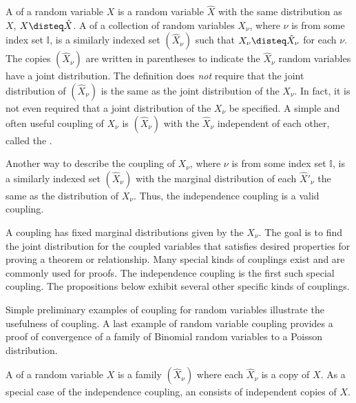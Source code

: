 \documentclass[12pt]{article}
\begin{document}
\begin{definition}
    A %
    of a random variable \( X \) is a random variable \( \hat{X} \) with
    the same distribution as \( X \), \( X \disteq \hat{X} \).  A 
    of a collection of random variables \( X_\nu \), where \( \nu \) is
    from some index set \( \mathbb{I} \), is a similarly indexed set \(
    (\hat{X}_\nu) \) such that \( X_{\nu} \disteq \hat{X}_{\nu} \) for
    each \( \nu \).  The copies \( (\hat{X}_\nu) \) are written in
    parentheses to indicate the \( \hat{X}_\nu \) random variables have
    a joint distribution.  The definition does \emph{not} require that
    the joint distribution of \( (\hat{X}_{\nu}) \) is the same as the
    joint distribution of the \( X_{\nu} \).  In fact, it is not even
    required that a joint distribution of the \( X_{\nu} \) be
    specified.  A simple and often useful coupling of \( X_{\nu} \) is \(
    (\hat{X}_\nu) \) with the \( \hat{X}_{\nu} \) independent of each
    other, called the .
\end{definition}
%

\begin{remark}
    Another way to describe the coupling of \( X_\nu \), where \( \nu \)
    is from some index set \( \mathbb{I} \), is a similarly indexed set \(
    (\hat{X}_\nu) \) with the marginal distribution of each \( \hat{X}'_
    {\nu} \) the same as the distribution of \( X_{\nu} \).  Thus, the
    independence coupling is a valid coupling.

    A coupling has fixed marginal distributions given by the \( X_\nu \).
    The goal is to find the joint distribution for the coupled variables
    that satisfies desired properties for proving a theorem or
    relationship.  Many special kinds of couplings exist and are
    commonly used for proofs.  The independence coupling is the first
    such special coupling.  The propositions below exhibit several other
    specific kinds of couplings.
\end{remark}

Simple preliminary examples of coupling for random variables illustrate
the usefulness of coupling.  A last example of random variable coupling
provides a proof of convergence of a family of Binomial random variables
to a Poisson distribution.

\begin{definition}
    A  of a random variable \( X \) is a family \( (\hat
    {X}_\nu) \) where each \( \hat{X}_\nu \) is a copy of \( X \).  As a
    special case of the independence coupling, an 
    consists of independent copies of \( X \).
\end{definition}
\end{document}
